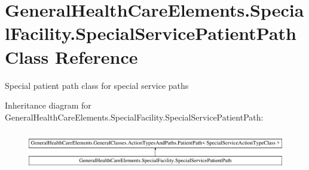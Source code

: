 \hypertarget{class_general_health_care_elements_1_1_special_facility_1_1_special_service_patient_path}{}\section{General\+Health\+Care\+Elements.\+Special\+Facility.\+Special\+Service\+Patient\+Path Class Reference}
\label{class_general_health_care_elements_1_1_special_facility_1_1_special_service_patient_path}


Special patient path class for special service paths  


Inheritance diagram for General\+Health\+Care\+Elements.\+Special\+Facility.\+Special\+Service\+Patient\+Path\+:\begin{figure}[H]
\begin{center}
\leavevmode
\includegraphics[height=1.666667cm]{class_general_health_care_elements_1_1_special_facility_1_1_special_service_patient_path}
\end{center}
\end{figure}
